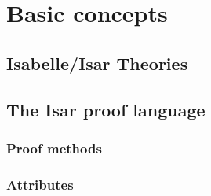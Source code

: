 
\chapter{Basic concepts}

\section{Isabelle/Isar Theories}

\section{The Isar proof language}

\subsection{Proof methods}

\subsection{Attributes}


